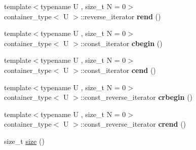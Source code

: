 \begin{DoxyCompactItemize}
\item 
\hypertarget{classheterogeneous_1_1heterolist_3_01_t_00_01_types_8_8_8_4_a55b1348f083a47b89e78dab7ba7c3632}{}{\footnotesize template$<$typename U , size\+\_\+t N = 0$>$ }\\container\+\_\+type$<$ U $>$\+::reverse\+\_\+iterator {\bfseries rend} ()\label{classheterogeneous_1_1heterolist_3_01_t_00_01_types_8_8_8_4_a55b1348f083a47b89e78dab7ba7c3632}

\item 
\hypertarget{classheterogeneous_1_1heterolist_3_01_t_00_01_types_8_8_8_4_a8c7115f0f1dd279b04f4177f5d0f75ae}{}{\footnotesize template$<$typename U , size\+\_\+t N = 0$>$ }\\container\+\_\+type$<$ U $>$\+::const\+\_\+iterator {\bfseries cbegin} ()\label{classheterogeneous_1_1heterolist_3_01_t_00_01_types_8_8_8_4_a8c7115f0f1dd279b04f4177f5d0f75ae}

\item 
\hypertarget{classheterogeneous_1_1heterolist_3_01_t_00_01_types_8_8_8_4_af68e91828a30cee5883bafaf13fabd69}{}{\footnotesize template$<$typename U , size\+\_\+t N = 0$>$ }\\container\+\_\+type$<$ U $>$\+::const\+\_\+iterator {\bfseries cend} ()\label{classheterogeneous_1_1heterolist_3_01_t_00_01_types_8_8_8_4_af68e91828a30cee5883bafaf13fabd69}

\item 
\hypertarget{classheterogeneous_1_1heterolist_3_01_t_00_01_types_8_8_8_4_a86b476cde33c0b3b464678b6303f97c2}{}{\footnotesize template$<$typename U , size\+\_\+t N = 0$>$ }\\container\+\_\+type$<$ U $>$\+::const\+\_\+reverse\+\_\+iterator {\bfseries crbegin} ()\label{classheterogeneous_1_1heterolist_3_01_t_00_01_types_8_8_8_4_a86b476cde33c0b3b464678b6303f97c2}

\item 
\hypertarget{classheterogeneous_1_1heterolist_3_01_t_00_01_types_8_8_8_4_a279ad88926dfc099ba690004f2c33cda}{}{\footnotesize template$<$typename U , size\+\_\+t N = 0$>$ }\\container\+\_\+type$<$ U $>$\+::const\+\_\+reverse\+\_\+iterator {\bfseries crend} ()\label{classheterogeneous_1_1heterolist_3_01_t_00_01_types_8_8_8_4_a279ad88926dfc099ba690004f2c33cda}

\item 
\hypertarget{classheterogeneous_1_1heterolist_3_01_t_00_01_types_8_8_8_4_a9ff99cb1a3baff0c2c422da38cb64cd0}{}size\+\_\+t \hyperlink{classheterogeneous_1_1heterolist_3_01_t_00_01_types_8_8_8_4_a9ff99cb1a3baff0c2c422da38cb64cd0}{size} ()\label{classheterogeneous_1_1heterolist_3_01_t_00_01_types_8_8_8_4_a9ff99cb1a3baff0c2c422da38cb64cd0}


\end{DoxyCompactItemize}
